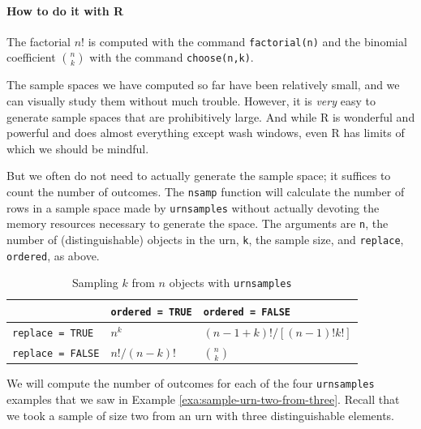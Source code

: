 \documentclass[captions=tableheading]{scrbook}
\begin{document}
\paragraph*{How to do it with \textsf{R}}

The factorial \(n!\) is computed with the command \texttt{factorial(n)} and the binomial coefficient \({n \choose k}\) with the command \texttt{choose(n,k)}.

The sample spaces we have computed so far have been relatively small, and we can visually study them without much trouble. However, it is \emph{very} easy to generate sample spaces that are prohibitively large. And while \textsf{R} is wonderful and powerful and does almost everything except wash windows, even \textsf{R} has limits of which we should be mindful.

But we often do not need to actually generate the sample space; it suffices to count the number of outcomes. The \texttt{nsamp} function will calculate the number of rows in a sample space made by \texttt{urnsamples} without actually devoting the memory resources necessary to generate the space. The arguments are \texttt{n}, the number of (distinguishable) objects in the urn, \texttt{k}, the sample size, and \texttt{replace}, \texttt{ordered}, as above.


\begin{table}[htb]
\caption{Sampling \(k\) from \(n\) objects with \texttt{urnsamples}} \label{tab:Sampling-k-from-n}
\begin{center}
\begin{tabular}{lll}
                           &  \texttt{ordered = TRUE}  &  \texttt{ordered = FALSE}   \\
\hline
 \texttt{replace = TRUE}   &  \(n^{k}\)                &  \((n-1+k)! / [(n-1)!k!]\)  \\
 \texttt{replace = FALSE}  &  \( n! / (n-k)! \)        &  \( {n \choose k} \)        \\
\hline
\end{tabular}
\end{center}
\end{table}



\begin{example}
We will compute the number of outcomes for each of the four \texttt{urnsamples} examples that we saw in Example \ref{exa:sample-urn-two-from-three}. Recall that we took a sample of size two from an urn with three distinguishable elements.
\end{example}
\end{document}
